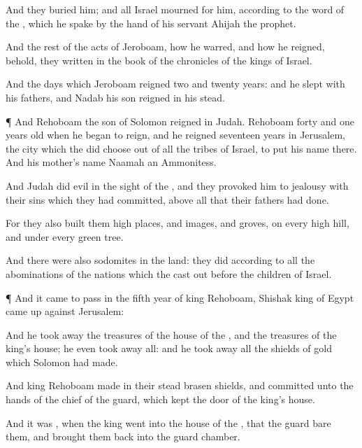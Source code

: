 {And they
buried him; and all
Israel
mourned for him, according to the
word of the
{}, which he
spake by the
hand of his
servant
Ahijah the
prophet.

And the
rest of the
acts of
Jeroboam, how he
warred, and how he
reigned, behold, they
{}
written in the
book of the
chronicles of the
kings of
Israel.

And the
days which
Jeroboam
reigned
{}
two and
twenty
years: and he
slept with his
fathers, and
Nadab his
son
reigned in his stead.


\par }{\PP {}¶ And
Rehoboam the
son of
Solomon
reigned in
Judah.
Rehoboam
{}
forty and
one
years
old when he began to
reign, and he
reigned
seventeen
years in
Jerusalem, the
city which the
{} did
choose out of all the
tribes of
Israel, to
put his
name there. And his
mother’s
name
{}
Naamah an
Ammonitess.

And
Judah
did
evil in the
sight of the
{}, and they provoked him to
jealousy with their
sins which they had
committed, above all that their
fathers had
done.

For they also
built them high
places, and
images, and
groves, on every
high
hill, and under every
green
tree.

And there were also
sodomites in the
land:
{} they
did according to all the
abominations of the
nations which the
{} cast
out
before the
children of
Israel.


\par }{\PP {}¶ And it came to pass in the
fifth
year of
king
Rehoboam,
{}
Shishak
king of
Egypt came
up against
Jerusalem:

And he took
away the
treasures of the
house of the
{}, and the
treasures of the
king’s
house; he even took
away all: and he took
away all the
shields of
gold which
Solomon had
made.

And
king
Rehoboam
made in their stead
brasen
shields, and
committed
{} unto the
hands of the
chief of the
guard, which
kept the
door of the
king’s
house.

And it was
{},
when the
king
went into the
house of the
{}, that the
guard
bare them, and brought them
back into the
guard
chamber.


}
